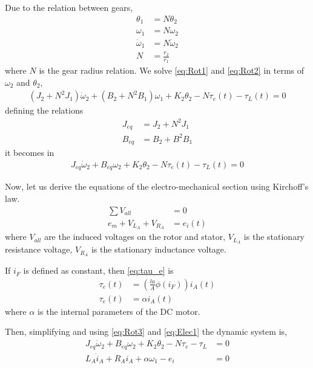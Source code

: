 \documentclass[]{article}
\begin{document}
Due to the relation between gears,
\begin{align*}
	\theta_1       & = N \theta_2       \\
	\omega_1       & = N \omega_2       \\
	\dot{\omega}_1 & = N \dot{\omega}_2 \\
	N              & = \frac{r_2}{r_1}
\end{align*}
where $N$ is the gear radius relation. We solve \eqref{eq:Rot1} and \eqref{eq:Rot2} in terms of $\omega_2$ and $\theta_2$,
\begin{align}
	(J_2+N^2 J_1)\dot{\omega}_2+(B_2+N^2 B_1)\omega_1+K_2 \theta_2-N \tau_e(t)-\tau_L(t) = 0 \nonumber 
\end{align}
defining the relations
\begin{align*}
	J_{eq} & = J_2+N^2 J_1 \\
	B_{eq} & = B_2+B^2 B_1
\end{align*}
it becomes in
\begin{align}	
	J_{eq} \dot{\omega}_2+B_{eq} \omega_2+K_2 \theta_2-N \tau_e(t)-\tau_L(t) = 0 \label{eq:Rot3}
\end{align}

Now, let us derive the equations of the electro-mechanical section using Kirchoff's law.
\begin{align}
	\sum V_{all}            & = 0 		\nonumber             \\
	e_m+V_{L_{A}}+V_{R_{A}} & = e_i(t) 	\label{eq:Elec1}
\end{align}
where $V_{all}$ are the induced voltages on the rotor and stator, $V_{L_{A}}$ is the stationary resistance voltage, $V_{R_{A}}$ is the stationary inductance voltage.  

If $i_F$ is defined as constant, then \eqref{eq:tau_e} is
\begin{align}
	\tau_e(t) & = \left( \frac{l a}{A} \phi(i_F) \right) i_A(t)	\nonumber \\
	\tau_e(t) & = \alpha i_A(t)
\end{align}
where $\alpha$ is the internal parameters of the DC motor.

Then, simplifying and using \eqref{eq:Rot3} and \eqref{eq:Elec1} the dynamic system is, 
\begin{align}
	J_{eq} \dot{\omega}_2+B_{eq} \omega_2+K_2 \theta_2-N \tau_e - \tau_L & = 0 \\
	L_A \dot{i}_A + R_A i_A + \alpha \omega_1 - e_i                      & = 0
\end{align}
\end{document}
